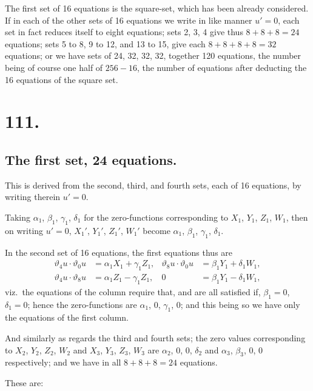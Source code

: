 \documentclass[11pt,a4paper]{article}
\newcommand{\uth}[1]{\vartheta_{#1}}
\begin{document}
The first set of 16 equations is the square-set, which has been already considered. If in each of the other sets of 16 equations we write in like manner $u' = 0$, each set in fact reduces itself to eight equations; sets 2, 3, 4 give thus $8 + 8 + 8 = 24$ equations; sets 5 to 8, 9 to 12, and 13 to 15, give each $8 + 8 + 8 + 8 = 32$ equations; or we have sets of 24, 32, 32, 32, together 120 equations, the number being of course one half of $256 - 16$, the number of equations after deducting the 16 equations of the square set.

\newpage
\section*{111.}
\label{sec:111}

\subsection*{The first set, 24 equations.}

This is derived from the second, third, and fourth sets, each of 16 equations, by writing therein $u' = 0$.

Taking $\alpha_1$, $\beta_1$, $\gamma_1$, $\delta_1$ for the zero-functions corresponding to $X_1$, $Y_1$, $Z_1$, $W_1$, then on writing $u' = 0$, $X_1'$, $Y_1'$, $Z_1'$, $W_1'$ become $\alpha_1$, $\beta_1$, $\gamma_1$, $\delta_1$.

In the second set of 16 equations, the first equations thus are
\begin{align*}
\uth{4}u \cdot \uth{0}u &= \alpha_1 X_1 + \gamma_1 Z_1, & \uth{8}u \cdot \uth{0}u &= \beta_1 Y_1 + \delta_1 W_1, \\
\uth{4}u \cdot \uth{8}u &= \alpha_1 Z_1 - \gamma_1 Z_1, & 0 &= \beta_1 Y_1 - \delta_1 W_1,
\end{align*}
viz.\ the equations of the column require that, and are all satisfied if, $\beta_1 = 0$, $\delta_1 = 0$; hence the zero-functions are $\alpha_1$, $0$, $\gamma_1$, $0$; and this being so we have only the equations of the first column.

And similarly as regards the third and fourth sets; the zero values corresponding to $X_2$, $Y_2$, $Z_2$, $W_2$ and $X_3$, $Y_3$, $Z_3$, $W_3$ are $\alpha_2$, $0$, $0$, $\delta_2$ and $\alpha_3$, $\beta_3$, $0$, $0$ respectively; and we have in all $8 + 8 + 8 = 24$ equations.

These are:
\end{document}
